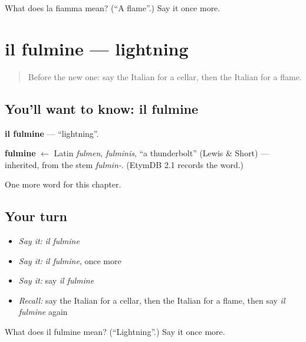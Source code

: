 \begin{tcolorbox}[breakable,colback=teal!4,colframe=teal!35!black,title={Before you move on}]
What does la fiamma mean? (\textquotedblleft{}A flame\textquotedblright{}.) Say it once more.
\end{tcolorbox}
\section[il fulmine]{il fulmine — lightning}

\label{lesson:IT-C256-fulmine}



\begin{quote}
Before the new one: say the Italian for a cellar, then the Italian for a flame.
\end{quote}

\subsection*{You'll want to know: il fulmine}
\textbf{il fulmine} — \textquotedblleft{}lightning\textquotedblright{}.

\begin{cousinweb}
\textbf{fulmine} $\leftarrow$ Latin \emph{fulmen}, \emph{fulminis}, \textquotedblleft{}a thunderbolt\textquotedblright{} (Lewis \& Short) — inherited, from the stem \emph{fulmin-}. (EtymDB 2.1 records the word.)
\end{cousinweb}

\begin{grammarlens}[title={What you've built}]
One more word for this chapter.
\end{grammarlens}

\subsection*{Your turn}
\begin{itemize}
\raggedright
  \item \emph{Say it:} \emph{il fulmine}
  \item \emph{Say it:} \emph{il fulmine}, once more
  \item \emph{Say it:} say \emph{il fulmine}
  \item \emph{Recall:} say the Italian for a cellar, then the Italian for a flame, then say \emph{il fulmine} again
\end{itemize}

\begin{tcolorbox}[breakable,colback=teal!4,colframe=teal!35!black,title={Before you move on}]
What does il fulmine mean? (\textquotedblleft{}Lightning\textquotedblright{}.) Say it once more.
\end{tcolorbox}
